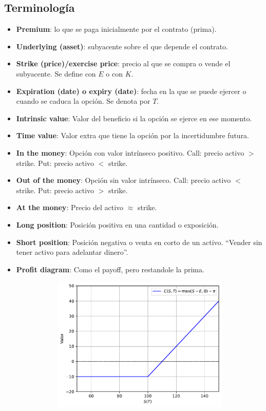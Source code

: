 \subsection{Terminología}
\begin{itemize}
    \item \textbf{Premium}: lo que se paga inicialmente por el contrato (prima).
    \item \textbf{Underlying (asset)}: subyacente sobre el que depende el contrato.
    \item \textbf{Strike (price)/exercise price}: precio al que se compra o vende el subyacente. Se define con $E$ o con $K$.
    \item \textbf{Expiration (date) o expiry (date)}: fecha en la que se puede ejercer o cuando se caduca la opción. Se denota por $T$.
    \item \textbf{Intrinsic value}: Valor del beneficio si la opción se ejerce en ese momento.
    \item \textbf{Time value}: Valor extra que tiene la opción por la incertidumbre futura.
    \item \textbf{In the money}: Opción con valor intrínseco positivo. Call: precio activo $>$ strike. Put: precio activo $<$ strike.
    \item \textbf{Out of the money}: Opción sin valor intrínseco. Call: precio activo $<$ strike. Put: precio activo $>$ strike.
    \item \textbf{At the money}: Precio del activo $\approx$ strike.
    \item \textbf{Long position}: Posición positiva en una cantidad o exposición.
    \item \textbf{Short position}: Posición negativa o venta en corto de un activo. ``Vender sin tener activo para adelantar dinero''.
    \item \textbf{Profit diagram}: Como el payoff, pero restandole la prima.
    \begin{figure}[H]
        \centering
        \begin{subfigure}[b]{0.45\linewidth}
            \includegraphics[width=\linewidth]{Imagenes/Parte1/2_Derivados/ProfitDiagCall.pdf}

\end{subfigure}
\end{figure}
\end{itemize}
